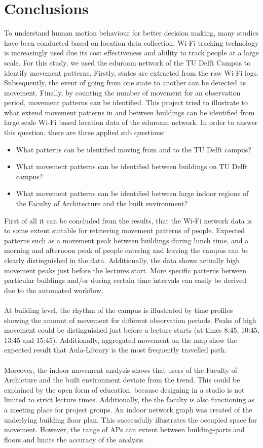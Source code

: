\chapter{Conclusions}\label{conclusion}
To understand human motion behaviour for better decision making, many studies have been conducted based on location data collection. Wi-Fi tracking technology is increasingly used due its cost effectiveness and ability to track people at a large scale. For this study, we used the eduroam network of the TU Delft Campus to identify movement patterns. Firstly, states are extracted from the raw Wi-Fi logs.  Subsequently, the event of going from one state to another can be detected as movement. Finally, by counting the number of movement for an observation period, movement patterns can be identified. This project tried to illustrate to what extend movement patterns in and between buildings can be identified from large scale Wi-Fi based location data of the eduroam network. In order to answer this question, there are three applied sub questions:
\begin{itemize}
\item What patterns can be identified moving from and to the TU Delft campus?
\item What movement patterns can be identified between buildings on TU Delft campus?
\item What movement patterns can be identified between large indoor regions of the Faculty of Architecture and the built environment?
\end{itemize}
First of all it can be concluded from the results, that the Wi-Fi network data is to some extent suitable for retrieving movement patterns of people. Expected patterns such as a movement peak between buildings during lunch time, and a morning and afternoon peak of people entering and leaving the campus can be clearly distinguished in the data. Additionally, the data shows actually high movement peaks just before the lectures start. More specific patterns between particular buildings and/or during certain time intervals can easily be derived due to the automated workflow.
\\\\
At building level, the rhythm of the campus is illustrated by time profiles showing the amount of movement for different observation periods. Peaks of high movement could be distinguished just before a lecture starts (at times 8:45, 10:45, 13:45 and 15:45). Additionally, aggregated movement on the map show the expected result that Aula-Library is the most frequently travelled path.
\\\\
Moreover, the indoor movement analysis shows that users of the Faculty of Archicture and the built environment deviate from the trend. This could be explained by the open form of education, because designing in a studio is not limited to strict lecture times. Additionally, the the faculty is also functioning as a meeting place for project groups. An indoor network graph was created of the underlying building floor plan. This successfully illustrates the occupied space for movement. However, the range of APs can extent between building-parts and floors and limits the accuracy of the analysis.